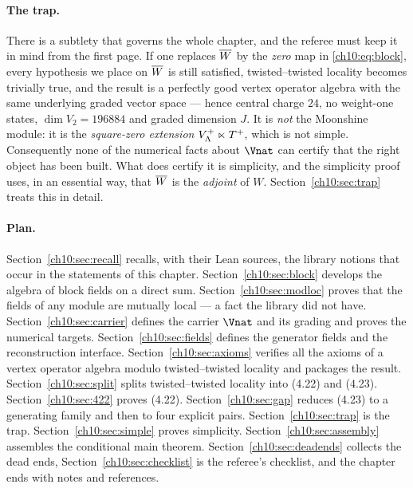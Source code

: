 \paragraph{The trap.}
There is a subtlety that governs the whole chapter, and the referee must keep it in mind from the
first page.  If one replaces $\overline{W}$ by the \emph{zero} map in \eqref{ch10:eq:block}, every
hypothesis we place on $\overline{W}$ is still satisfied, twisted--twisted locality becomes trivially
true, and the result is a perfectly good vertex operator algebra with the same underlying graded
vector space --- hence central charge $24$, no weight-one states, $\dim V_2=196884$ and graded
dimension $J$.  It is \emph{not} the Moonshine module: it is the \emph{square-zero extension}
$V_{\Lambda}^{+}\ltimes T^{+}$, which is not simple.  Consequently none of the numerical facts about
$\Vnat$ can certify that the right object has been built.  What does certify it is simplicity,
and the simplicity proof uses, in an essential way, that $\overline{W}$ is the \emph{adjoint} of $W$.
Section~\ref{ch10:sec:trap} treats this in detail.

\paragraph{Plan.}
Section~\ref{ch10:sec:recall} recalls, with their Lean sources, the library notions that occur in
the statements of this chapter.  Section~\ref{ch10:sec:block} develops the algebra of block
fields on a direct sum.  Section~\ref{ch10:sec:modloc} proves that the fields of any module are
mutually local --- a fact the library did not have.  Section~\ref{ch10:sec:carrier} defines the
carrier $\Vnat$ and its grading and proves the numerical targets.
Section~\ref{ch10:sec:fields} defines the generator fields and the reconstruction interface.
Section~\ref{ch10:sec:axioms} verifies all the axioms of a vertex operator algebra modulo
twisted--twisted locality and packages the result.  Section~\ref{ch10:sec:split} splits
twisted--twisted locality into (4.22) and (4.23).  Section~\ref{ch10:sec:422} proves (4.22).
Section~\ref{ch10:sec:gap} reduces (4.23) to a generating family and then to four explicit pairs.
Section~\ref{ch10:sec:trap} is the trap.  Section~\ref{ch10:sec:simple} proves simplicity.
Section~\ref{ch10:sec:assembly} assembles the conditional main theorem.
Section~\ref{ch10:sec:deadends} collects the dead ends, Section~\ref{ch10:sec:checklist} is the
referee's checklist, and the chapter ends with notes and references.

